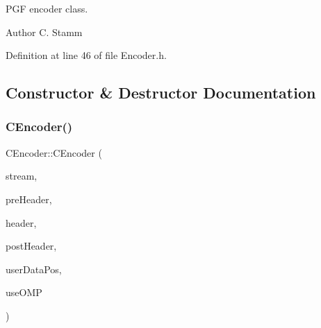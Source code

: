 P\+GF encoder class. \begin{DoxyAuthor}{Author}
C. Stamm 
\end{DoxyAuthor}


Definition at line 46 of file Encoder.\+h.



\subsection{Constructor \& Destructor Documentation}
\mbox{\label{classCEncoder_a5b4447882da7673e0b26e5ff69df4835}} 
\subsubsection{\texorpdfstring{CEncoder()}{CEncoder()}}
{\footnotesize\ttfamily C\+Encoder\+::\+C\+Encoder (\begin{DoxyParamCaption}\item[{\mbox{\hyperlink{classCPGFStream}{C\+P\+G\+F\+Stream}} $\ast$}]{stream,  }\item[{\mbox{\hyperlink{structPGFPreHeader}{P\+G\+F\+Pre\+Header}}}]{pre\+Header,  }\item[{\mbox{\hyperlink{structPGFHeader}{P\+G\+F\+Header}}}]{header,  }\item[{const \mbox{\hyperlink{structPGFPostHeader}{P\+G\+F\+Post\+Header}} \&}]{post\+Header,  }\item[{U\+I\+N\+T64 \&}]{user\+Data\+Pos,  }\item[{bool}]{use\+O\+MP }\end{DoxyParamCaption})}

